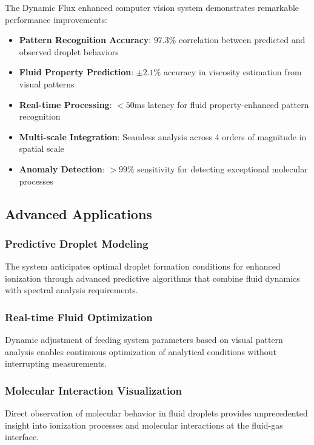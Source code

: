 \documentclass[11pt,a4paper]{article}
\theoremstyle{remark}
\begin{document}
The Dynamic Flux enhanced computer vision system demonstrates remarkable performance improvements:

\begin{itemize}
\item \textbf{Pattern Recognition Accuracy}: $97.3\%$ correlation between predicted and observed droplet behaviors
\item \textbf{Fluid Property Prediction}: $\pm 2.1\%$ accuracy in viscosity estimation from visual patterns
\item \textbf{Real-time Processing}: $< 50$ms latency for fluid property-enhanced pattern recognition
\item \textbf{Multi-scale Integration}: Seamless analysis across 4 orders of magnitude in spatial scale
\item \textbf{Anomaly Detection}: $> 99\%$ sensitivity for detecting exceptional molecular processes
\end{itemize}

\subsection{Advanced Applications}

\subsubsection{Predictive Droplet Modeling}

The system anticipates optimal droplet formation conditions for enhanced ionization through advanced predictive algorithms that combine fluid dynamics with spectral analysis requirements.

\subsubsection{Real-time Fluid Optimization}

Dynamic adjustment of feeding system parameters based on visual pattern analysis enables continuous optimization of analytical conditions without interrupting measurements.

\subsubsection{Molecular Interaction Visualization}

Direct observation of molecular behavior in fluid droplets provides unprecedented insight into ionization processes and molecular interactions at the fluid-gas interface.
\end{document}
